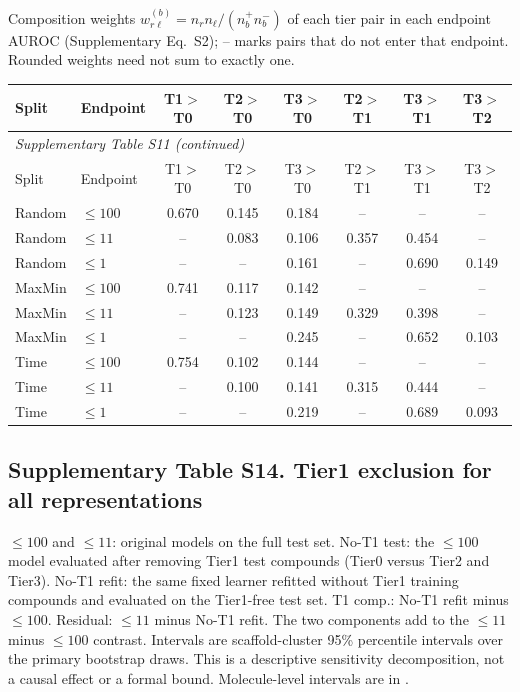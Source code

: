 Composition weights $w_{r\ell}^{(b)}=n_rn_\ell/(n_b^+n_b^-)$ of each tier pair in each endpoint AUROC (Supplementary Eq.~S2); -- marks pairs that do not enter that endpoint. Rounded weights need not sum to exactly one.

\begingroup\footnotesize\setlength{\tabcolsep}{3pt}

\begin{longtable}{llcccccc}

\toprule Split & Endpoint & T1$>$T0 & T2$>$T0 & T3$>$T0 & T2$>$T1 & T3$>$T1 & T3$>$T2 \\ \midrule\endfirsthead

\multicolumn{8}{l}{\textit{Supplementary Table S11 (continued)}} \\

\toprule Split & Endpoint & T1$>$T0 & T2$>$T0 & T3$>$T0 & T2$>$T1 & T3$>$T1 & T3$>$T2 \\ \midrule\endhead

\bottomrule\endlastfoot

Random & $\leq100$ & 0.670 & 0.145 & 0.184 & -- & -- & -- \\
Random & $\leq11$ & -- & 0.083 & 0.106 & 0.357 & 0.454 & -- \\
Random & $\leq1$ & -- & -- & 0.161 & -- & 0.690 & 0.149 \\
MaxMin & $\leq100$ & 0.741 & 0.117 & 0.142 & -- & -- & -- \\
MaxMin & $\leq11$ & -- & 0.123 & 0.149 & 0.329 & 0.398 & -- \\
MaxMin & $\leq1$ & -- & -- & 0.245 & -- & 0.652 & 0.103 \\
Time & $\leq100$ & 0.754 & 0.102 & 0.144 & -- & -- & -- \\
Time & $\leq11$ & -- & 0.100 & 0.141 & 0.315 & 0.444 & -- \\
Time & $\leq1$ & -- & -- & 0.219 & -- & 0.689 & 0.093 \\

\end{longtable}\endgroup

\subsection*{Supplementary Table S14. Tier1 exclusion for all representations}

$\leq100$ and $\leq11$: original models on the full test set. No-T1 test: the $\leq100$ model evaluated after removing Tier1 test compounds (Tier0 versus Tier2 and Tier3). No-T1 refit: the same fixed learner refitted without Tier1 training compounds and evaluated on the Tier1-free test set. T1 comp.: No-T1 refit minus $\leq100$. Residual: $\leq11$ minus No-T1 refit. The two components add to the $\leq11$ minus $\leq100$ contrast. Intervals are scaffold-cluster 95\% percentile intervals over the primary bootstrap draws. This is a descriptive sensitivity decomposition, not a causal effect or a formal bound. Molecule-level intervals are in .

